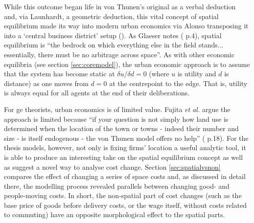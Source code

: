 While this outcome began life in von Thunen's original as a verbal deduction and, via Launhardt, a geometric deduction, this vital concept of spatial equilibrium made its way into modern urban economics via Alonso transposing it into a `central business district' setup (\citealt{alonso_location_1964}). As Glaeser notes (\citeyear{glaeser_cities_2008} p.4), spatial equilibrium is ``the bedrock on which everything else in the field stands... essentially, there must be no arbitrage across space''. As with other economic equilibria (see section \ref{sec:coremodel}), the urban economic approach is to assume that the system has become static at $\delta u/\delta d = 0$ (where $u$ is utility and $d$ is distance) as one moves from $d=0$ at the centrepoint to the edge. That is, utility is always equal for all agents at the end of their deliberations. 

For \gls{ge} theorists, urban economics is of limited value. Fujita \emph{et al.} argue the approach is limited because ``if your question is not simply how land use is determined when the location of the town or towns - indeed their number and size - is itself endogenous - the von Thunen model offers no help'' (\citealt{fujita_spatial_2001} p.18). For the thesis models, however, not only is fixing firms' location a useful analytic tool, it is able to produce an interesting take on the spatial equilibrium concept as well as suggest a novel way to analyse cost change. Section \ref{sec:spatialvsnon} compares the effect of changing a series of space costs and, as discussed in detail there, the modelling process revealed parallels between changing good- and people-moving costs. In short, the non-spatial part of cost changes (such as the base price of goods before delivery costs, or the wage itself, without costs related to commuting) have an opposite morphological effect to the spatial parts. 

